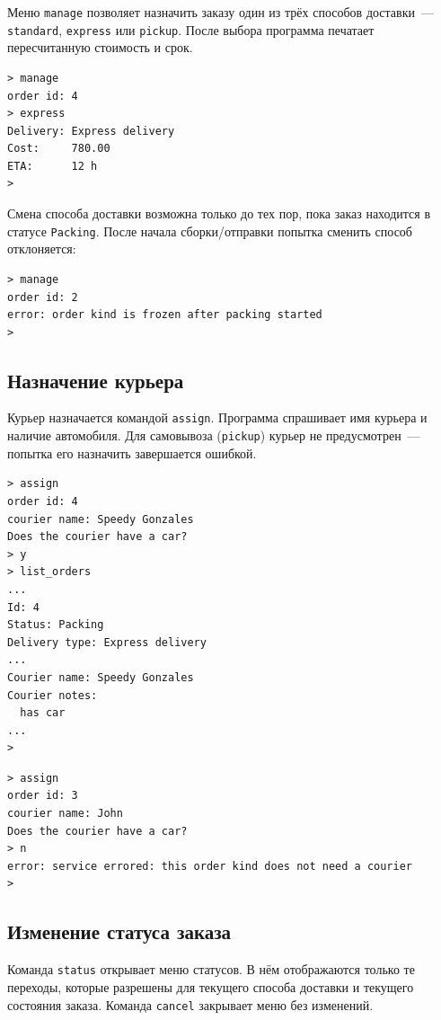\documentclass[12pt]{extarticle}
\renewcommand{\baselinestretch}{1.5}
\newcommand{\cmd}[1]{\texttt{#1}}
\begin{document}
Меню \cmd{manage} позволяет назначить заказу один из трёх способов
доставки~--- \cmd{standard}, \cmd{express} или \cmd{pickup}. После
выбора программа печатает пересчитанную стоимость и срок.

\renewcommand{\baselinestretch}{1}
\begin{lstlisting}
> manage
order id: 4
> express
Delivery: Express delivery
Cost:     780.00
ETA:      12 h
>
\end{lstlisting}
\renewcommand{\baselinestretch}{1.5}

Смена способа доставки возможна только до тех пор, пока заказ
находится в статусе \cmd{Packing}. После начала сборки/отправки
попытка сменить способ отклоняется:

\renewcommand{\baselinestretch}{1}
\begin{lstlisting}
> manage
order id: 2
error: order kind is frozen after packing started
>
\end{lstlisting}
\renewcommand{\baselinestretch}{1.5}

\subsection{Назначение курьера}

Курьер назначается командой \cmd{assign}. Программа спрашивает имя
курьера и наличие автомобиля. Для самовывоза (\cmd{pickup}) курьер
не предусмотрен~--- попытка его назначить завершается ошибкой.

\renewcommand{\baselinestretch}{1}
\begin{lstlisting}
> assign
order id: 4
courier name: Speedy Gonzales
Does the courier have a car?
> y
> list_orders
...
Id: 4
Status: Packing
Delivery type: Express delivery
...
Courier name: Speedy Gonzales
Courier notes:
  has car
...
>
\end{lstlisting}
\renewcommand{\baselinestretch}{1.5}

\renewcommand{\baselinestretch}{1}
\begin{lstlisting}
> assign
order id: 3
courier name: John
Does the courier have a car?
> n
error: service errored: this order kind does not need a courier
>
\end{lstlisting}
\renewcommand{\baselinestretch}{1.5}

\subsection{Изменение статуса заказа}

Команда \cmd{status} открывает меню статусов. В нём отображаются
только те переходы, которые разрешены для текущего способа доставки
и текущего состояния заказа. Команда \cmd{cancel} закрывает меню
без изменений.
\end{document}
